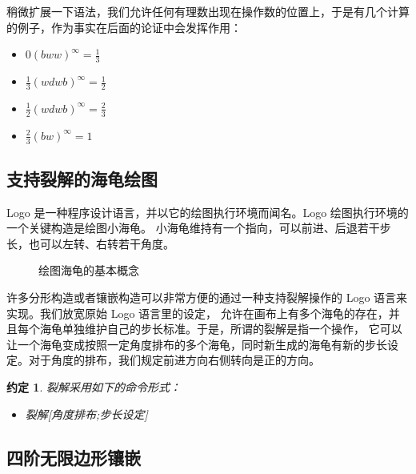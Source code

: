 \documentclass[a4paper,12pt]{article}
\newtheorem{convention}{约定}
\begin{document}
稍微扩展一下语法，我们允许任何有理数出现在操作数的位置上，于是有几个计算的例子，作为事实在后面的论证中会发挥作用：

\begin{itemize}
\item $0(bww)^\infty = \frac{1}{3}$
\item $\frac{1}{3}(wdwb)^\infty = \frac{1}{2}$
\item $\frac{1}{2}(wdwb)^\infty = \frac{2}{3}$
\item $\frac{2}{3}(bw)^\infty = 1$
\end{itemize}

\newpage

\subsection{支持裂解的海龟绘图}

Logo 是一种程序设计语言，并以它的绘图执行环境而闻名。Logo 绘图执行环境的一个关键构造是绘图小海龟。
小海龟维持有一个指向，可以前进、后退若干步长，也可以左转、右转若干角度。

\begin{figure}[ht]
\centering
{}
\caption{绘图海龟的基本概念}
\end{figure}

许多分形构造或者镶嵌构造可以非常方便的通过一种支持裂解操作的 Logo 语言来实现。我们放宽原始 Logo 语言里的设定，
允许在画布上有多个海龟的存在，并且每个海龟单独维护自己的步长标准。于是，所谓的裂解是指一个操作，
它可以让一个海龟变成按照一定角度排布的多个海龟，同时新生成的海龟有新的步长设定。对于角度的排布，我们规定前进方向右侧转向是正的方向。

\begin{convention}
裂解采用如下的命令形式：
\begin{itemize}
\item 裂解[角度排布;步长设定]
\end{itemize}
\end{convention}

\newpage

\subsection{四阶无限边形镶嵌}
\end{document}
